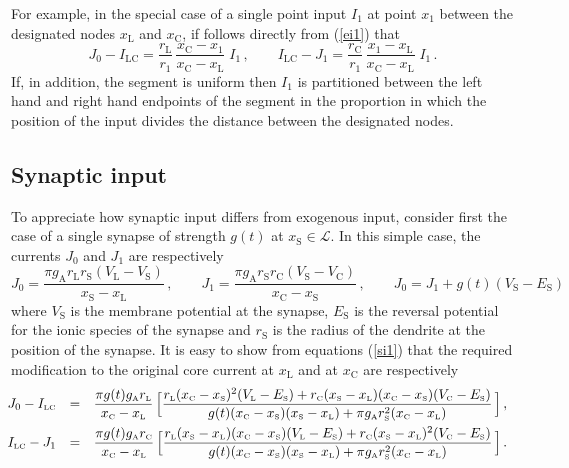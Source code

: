 For example, in the special case of a single point input $I_1$ at
point $x_1$ between the designated nodes $x_\mathrm{L}$ and
$x_\mathrm{C}$, if follows directly from (\ref{ei1}) that
\begin{equation}\label{ei9}
J_0-I_\mathrm{LC}=\frac{r_\mathrm{L}}{r_1}\,
\frac{x_\mathrm{C}-x_1}{x_\mathrm{C}-x_\mathrm{L}}\;I_1\,,\qquad
I_\mathrm{LC}-J_1=\frac{r_\mathrm{C}}{r_1}\,
\frac{x_1-x_\mathrm{L}}{x_\mathrm{C}-x_\mathrm{L}}\;I_1\,.
\end{equation}
If, in addition, the segment is uniform then $I_1$ is partitioned
between the left hand and right hand endpoints of the segment in
the proportion in which the position of the input divides the
distance between the designated nodes.

\subsection{Synaptic input}
To appreciate how synaptic input differs from exogenous input,
consider first the case of a single synapse of strength $g(t)$ at
$x_\mathrm{S}\in\mathcal{L}$. In this simple case, the currents
$J_0$ and $J_1$ are respectively
\begin{equation}\label{si1}
J_0 = \frac{\pi g_\mathrm{A}r_\mathrm{L} r_\mathrm{S}
(V_\mathrm{L}-V_\mathrm{S})}{x_\mathrm{S}-x_\mathrm{L}}\,,
\qquad
J_1 = \frac{\pi g_\mathrm{A}r_\mathrm{S} r_\mathrm{C}
(V_\mathrm{S}-V_\mathrm{C})}{x_\mathrm{C}-x_\mathrm{S}}\,,
\qquad J_0=J_1+g(t)(V_\mathrm{S}-E_\mathrm{S})
\end{equation}
where $V_\mathrm{S}$ is the membrane potential at the synapse,
$E_\mathrm{S}$ is the reversal potential for the ionic species of
the synapse and $r_\mathrm{S}$ is the radius of the dendrite at
the position of the synapse. It is easy to show from equations
(\ref{si1}) that the required modification to the original core
current at $x_\mathrm{L}$ and at $x_\mathrm{C}$ are respectively
\begin{equation}\label{si2}
\hskip-8pt\begin{array}{rcl}
J_0-I_{\mbox{\tiny LC}}& = & \displaystyle\frac{\pi g(t) g_{\mbox{\tiny A}}r_{\mbox{\tiny L}}}
{x_{\mbox{\tiny C}}-x_{\mbox{\tiny L}}}\,\Big[
\frac{r_{\mbox{\tiny L}}(x_{\mbox{\tiny C}}-x_{\mbox{\tiny S}})^2
(V_{\mbox{\tiny L}}-E_{\mbox{\tiny S}})+r_{\mbox{\tiny C}}(x_{\mbox{\tiny S}}-x_{\mbox{\tiny L}})
(x_{\mbox{\tiny C}}-x_{\mbox{\tiny S}})(V_{\mbox{\tiny C}}-E_{\mbox{\tiny S}})}
{g(t)(x_{\mbox{\tiny C}}-x_{\mbox{\tiny S}})(x_{\mbox{\tiny S}}-x_{\mbox{\tiny L}})+
\pi g_{\mbox{\tiny A}} r^2_{\mbox{\tiny S}}(x_{\mbox{\tiny C}}-x_{\mbox{\tiny L}})}\,\Big]\,,\\[10pt]
I_{\mbox{\tiny LC}}-J_1 & = & \displaystyle\frac{\pi g(t) g_{\mbox{\tiny A}}r_{\mbox{\tiny C}}}
{x_{\mbox{\tiny C}}-x_{\mbox{\tiny L}}}\,\Big[
\frac{r_{\mbox{\tiny L}}(x_{\mbox{\tiny S}}-x_{\mbox{\tiny L}})
(x_{\mbox{\tiny C}}-x_{\mbox{\tiny S}})(V_{\mbox{\tiny L}}-E_{\mbox{\tiny S}})
+r_{\mbox{\tiny C}}(x_{\mbox{\tiny S}}-x_{\mbox{\tiny L}})^2
(V_{\mbox{\tiny C}}-E_{\mbox{\tiny S}})}{g(t)(x_{\mbox{\tiny C}}-x_{\mbox{\tiny S}})
(x_{\mbox{\tiny S}}-x_{\mbox{\tiny L}})+\pi g_{\mbox{\tiny A}} r^2_{\mbox{\tiny S}}
(x_{\mbox{\tiny C}}-x_{\mbox{\tiny L}})}\,\Big]\,.
\end{array}
\end{equation}
